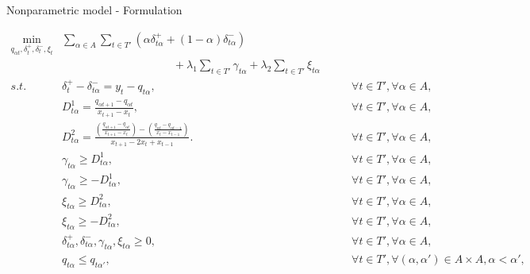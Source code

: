 \begin{frame}{Nonparametric model - Formulation}

\tiny

\begin{eqnarray}
\min_{q_{\alpha t},\delta^+_{t}, \delta_t^-, \xi_t} & \sum_{\alpha \in A} \sum_{t \in T'}\left(\alpha\delta_{t \alpha }^{+}+(1-\alpha)\delta_{t \alpha }^{-}\right) & \\
& \qquad \qquad \qquad \qquad \qquad + \lambda_1\sum_{t \in T'}\gamma_{t \alpha } + \lambda_2\sum_{t \in T'}\xi_{t \alpha } & \nonumber \\
s.t. & \delta_{t}^{+}-\delta_{t \alpha }^{-}=y_{t}-q_{t \alpha }, & \qquad\forall t \in T',\forall \alpha \in A,\\
   & D^{1}_{t \alpha }=\frac{q_{\alpha t+1}-q_{\alpha t}}{x_{t+1}-x_{t}},
    & \qquad\forall t \in T',\forall \alpha \in A,\\   
 & D^{2}_{t \alpha }=\frac{\left(\frac{q_{\alpha t+1}-q_{\alpha t}}{x_{t+1}-x_{t}}\right)-\left(\frac{q_{\alpha t}-q_{\alpha t-1}}{x_{t}-x_{t-1}}\right)}{x_{t+1}-2x_{t} + x_{t-1}}.
  & \qquad\forall t \in T',\forall \alpha \in A,\\
 & \gamma_{t \alpha}\geq D^1_{t \alpha }, & \qquad\forall t \in T',\forall \alpha \in A,\\
  & \gamma_{t \alpha}\geq-D^1_{t \alpha}, & \qquad\forall t \in T',\forall \alpha \in A,\\
  & \xi_{t \alpha}\geq D^2_{t \alpha }, & \qquad\forall t \in T',\forall \alpha \in A,\\
 & \xi_{t \alpha}\geq-D^2_{t \alpha}, & \qquad\forall t \in T',\forall \alpha \in A,\\
 & \delta_{t \alpha}^{+},\delta_{t \alpha}^{-},\gamma_{t \alpha}, \xi_{t \alpha}\geq0, & \qquad\forall t \in T',\forall \alpha \in A,\\
  & q_{t \alpha} \leq q_{t \alpha'}, & \qquad \forall t \in T', \forall (\alpha, \alpha') \in A \times A, \alpha < \alpha',\nonumber \\  
  \end{eqnarray}

\end{frame}

